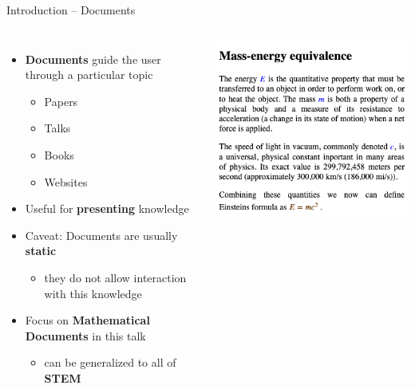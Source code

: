 \documentclass{beamer}
\begin{document}
    \begin{frame}{Introduction -- Documents}
        \begin{columns}
            \begin{itemize}
                \item \textbf{Documents} guide the user through a particular topic
                \begin{itemize}
                    \item Papers
                    \item Talks
                    \item Books
                    \item Websites
                \end{itemize}
                \item Useful for \textbf{presenting} knowledge
                \item Caveat: Documents are usually \textbf{static}
                \begin{itemize}
                    \item they do not allow interaction with this knowledge
                \end{itemize}
                \item Focus on \textbf{Mathematical Documents} in this talk
                \begin{itemize}
                    \item can be generalized to all of \textbf{STEM}
                \end{itemize}
            \end{itemize}
            \includegraphics[scale=0.25]{images/doc}
        \end{columns}
    \end{frame}
\end{document}
